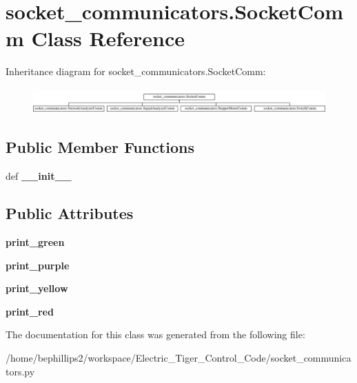 \hypertarget{classsocket__communicators_1_1_socket_comm}{\section{socket\-\_\-communicators.\-Socket\-Comm Class Reference}
\label{classsocket__communicators_1_1_socket_comm}
}
Inheritance diagram for socket\-\_\-communicators.\-Socket\-Comm\-:\begin{figure}[H]
\begin{center}
\leavevmode
\includegraphics[height=0.992908cm]{classsocket__communicators_1_1_socket_comm}
\end{center}
\end{figure}
\subsection*{Public Member Functions}
\begin{DoxyCompactItemize}
\item 
\hypertarget{classsocket__communicators_1_1_socket_comm_aaeb5d28eb308f1b2a8f46599f60bc9d0}{def {\bfseries \-\_\-\-\_\-init\-\_\-\-\_\-}}\label{classsocket__communicators_1_1_socket_comm_aaeb5d28eb308f1b2a8f46599f60bc9d0}

\end{DoxyCompactItemize}
\subsection*{Public Attributes}
\begin{DoxyCompactItemize}
\item 
\hypertarget{classsocket__communicators_1_1_socket_comm_ab1765fc4099cff29ee2a5b254efe4d4e}{{\bfseries print\-\_\-green}}\label{classsocket__communicators_1_1_socket_comm_ab1765fc4099cff29ee2a5b254efe4d4e}

\item 
\hypertarget{classsocket__communicators_1_1_socket_comm_ad581f565c75b66877324998bbf961ae4}{{\bfseries print\-\_\-purple}}\label{classsocket__communicators_1_1_socket_comm_ad581f565c75b66877324998bbf961ae4}

\item 
\hypertarget{classsocket__communicators_1_1_socket_comm_a9d6bb220382a1a637475fce0d1dfc173}{{\bfseries print\-\_\-yellow}}\label{classsocket__communicators_1_1_socket_comm_a9d6bb220382a1a637475fce0d1dfc173}

\item 
\hypertarget{classsocket__communicators_1_1_socket_comm_a901c2955ed1807df58545e39a4952c0d}{{\bfseries print\-\_\-red}}\label{classsocket__communicators_1_1_socket_comm_a901c2955ed1807df58545e39a4952c0d}

\end{DoxyCompactItemize}


The documentation for this class was generated from the following file\-:\begin{DoxyCompactItemize}
\item 
/home/bephillips2/workspace/\-Electric\-\_\-\-Tiger\-\_\-\-Control\-\_\-\-Code/socket\-\_\-communicators.\-py\end{DoxyCompactItemize}
